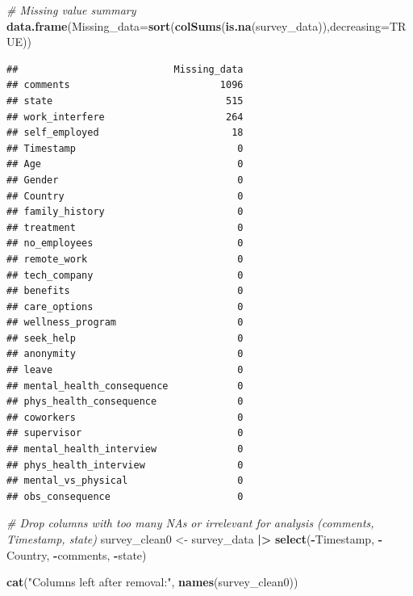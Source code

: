 \documentclass[
]{article}
\newenvironment{Shaded}{\begin{snugshade}}{\end{snugshade}}
\newcommand{\AttributeTok}[1]{\textcolor[rgb]{0.13,0.29,0.53}{#1}}
\newcommand{\CommentTok}[1]{\textcolor[rgb]{0.56,0.35,0.01}{\textit{#1}}}
\newcommand{\ConstantTok}[1]{\textcolor[rgb]{0.56,0.35,0.01}{#1}}
\newcommand{\FunctionTok}[1]{\textcolor[rgb]{0.13,0.29,0.53}{\textbf{#1}}}
\newcommand{\NormalTok}[1]{#1}
\newcommand{\OtherTok}[1]{\textcolor[rgb]{0.56,0.35,0.01}{#1}}
\newcommand{\SpecialCharTok}[1]{\textcolor[rgb]{0.81,0.36,0.00}{\textbf{#1}}}
\newcommand{\StringTok}[1]{\textcolor[rgb]{0.31,0.60,0.02}{#1}}
\begin{document}
\begin{Shaded}
\begin{Highlighting}[]
\CommentTok{\# Missing value summary}
\FunctionTok{data.frame}\NormalTok{(}\AttributeTok{Missing\_data=}\FunctionTok{sort}\NormalTok{(}\FunctionTok{colSums}\NormalTok{(}\FunctionTok{is.na}\NormalTok{(survey\_data)),}\AttributeTok{decreasing=}\ConstantTok{TRUE}\NormalTok{))}
\end{Highlighting}
\end{Shaded}

\begin{verbatim}
##                           Missing_data
## comments                          1096
## state                              515
## work_interfere                     264
## self_employed                       18
## Timestamp                            0
## Age                                  0
## Gender                               0
## Country                              0
## family_history                       0
## treatment                            0
## no_employees                         0
## remote_work                          0
## tech_company                         0
## benefits                             0
## care_options                         0
## wellness_program                     0
## seek_help                            0
## anonymity                            0
## leave                                0
## mental_health_consequence            0
## phys_health_consequence              0
## coworkers                            0
## supervisor                           0
## mental_health_interview              0
## phys_health_interview                0
## mental_vs_physical                   0
## obs_consequence                      0
\end{verbatim}

\begin{Shaded}
\begin{Highlighting}[]
\CommentTok{\# Drop columns with too many NAs or irrelevant for analysis (comments, Timestamp, state)}
\NormalTok{survey\_clean0 }\OtherTok{\textless{}{-}}\NormalTok{ survey\_data }\SpecialCharTok{|\textgreater{}}
  \FunctionTok{select}\NormalTok{(}\SpecialCharTok{{-}}\NormalTok{Timestamp, }\SpecialCharTok{{-}}\NormalTok{Country, }\SpecialCharTok{{-}}\NormalTok{comments, }\SpecialCharTok{{-}}\NormalTok{state)}

\FunctionTok{cat}\NormalTok{(}\StringTok{"Columns left after removal:"}\NormalTok{, }\FunctionTok{names}\NormalTok{(survey\_clean0))}
\end{Highlighting}
\end{Shaded}
\end{document}

